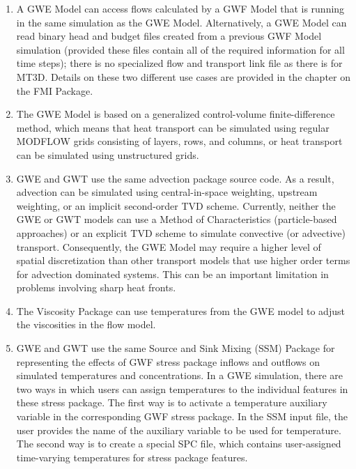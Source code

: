\begin{enumerate}

\item A GWE Model can access flows calculated by a GWF Model that is running in the same simulation as the GWE Model.  Alternatively, a GWE Model can read binary head and budget files created from a previous GWF Model simulation (provided these files contain all of the required information for all time steps); there is no specialized flow and transport link file \citep{zheng2001modflow} as there is for MT3D.  Details on these two different use cases are provided in the chapter on the FMI Package.

\item The GWE Model is based on a generalized control-volume finite-difference method, which means that heat transport can be simulated using regular MODFLOW grids consisting of layers, rows, and columns, or heat transport can be simulated using unstructured grids.

\item GWE and GWT use the same advection package source code.  As a result, advection can be simulated using central-in-space weighting, upstream weighting, or an implicit second-order TVD scheme.  Currently, neither the GWE or GWT models can use a Method of Characteristics (particle-based approaches) or an explicit TVD scheme to simulate convective (or advective) transport.  Consequently, the GWE Model may require a higher level of spatial discretization than other transport models that use higher order terms for advection dominated systems.  This can be an important limitation in problems involving sharp heat fronts. 

\item The Viscosity Package can use temperatures from the GWE model to adjust the viscosities in the flow model.   

\item GWE and GWT use the same Source and Sink Mixing (SSM) Package for representing the effects of GWF stress package inflows and outflows on simulated temperatures and concentrations.  In a GWE simulation, there are two ways in which users can assign temperatures to the individual features in these stress package.  The first way is to activate a temperature auxiliary variable in the corresponding GWF stress package.  In the SSM input file, the user provides the name of the auxiliary variable to be used for temperature.  The second way is to create a special SPC file, which contains user-assigned time-varying temperatures for stress package features.


\end{enumerate}
